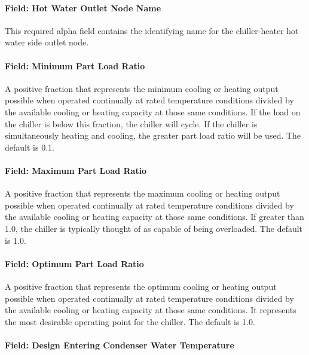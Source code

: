 \paragraph{Field: Hot Water Outlet Node Name}\label{field-hot-water-outlet-node-name}

This required alpha field contains the identifying name for the chiller-heater hot water side outlet node.

\paragraph{Field: Minimum Part Load Ratio}\label{field-minimum-part-load-ratio-7}

A positive fraction that represents the minimum cooling or heating output possible when operated continually at rated temperature conditions divided by the available cooling or heating capacity at those same conditions. If the load on the chiller is below this fraction, the chiller will cycle. If the chiller is simultaneously heating and cooling, the greater part load ratio will be used. The default is 0.1.

\paragraph{Field: Maximum Part Load Ratio}\label{field-maximum-part-load-ratio-7}

A positive fraction that represents the maximum cooling or heating output possible when operated continually at rated temperature conditions divided by the available cooling or heating capacity at those same conditions. If greater than 1.0, the chiller is typically thought of as capable of being overloaded. The default is 1.0.

\paragraph{Field: Optimum Part Load Ratio}\label{field-optimum-part-load-ratio-7}

A positive fraction that represents the optimum cooling or heating output possible when operated continually at rated temperature conditions divided by the available cooling or heating capacity at those same conditions. It represents the most desirable operating point for the chiller. The default is 1.0.

\paragraph{Field: Design Entering Condenser Water Temperature}\label{field-design-entering-condenser-water-temperature}

